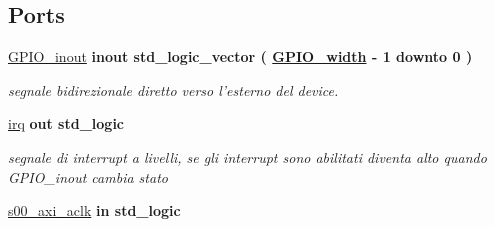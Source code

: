 \subsection*{Ports}
 \begin{DoxyCompactItemize}
\item 
\hypertarget{classmy_g_p_i_o_ga8829699d739ef35a4c5da396ffd38387}{\hyperlink{group__my_g_p_i_o_ga8829699d739ef35a4c5da396ffd38387}{G\+P\+I\+O\+\_\+inout}  {\bfseries {\bfseries \textcolor{vhdlchar}{inout}\textcolor{vhdlchar}{ }}} {\bfseries \textcolor{vhdlchar}{std\+\_\+logic\+\_\+vector}\textcolor{vhdlchar}{ }\textcolor{vhdlchar}{(}\textcolor{vhdlchar}{ }\textcolor{vhdlchar}{ }\textcolor{vhdlchar}{ }\textcolor{vhdlchar}{ }{\bfseries \hyperlink{group__my_g_p_i_o_ga0b52ca75e9a6093b2b60d5e851803069}{G\+P\+I\+O\+\_\+width}} \textcolor{vhdlchar}{-\/}\textcolor{vhdlchar}{ } \textcolor{vhdldigit}{1} \textcolor{vhdlchar}{ }\textcolor{vhdlchar}{downto}\textcolor{vhdlchar}{ }\textcolor{vhdlchar}{ } \textcolor{vhdldigit}{0} \textcolor{vhdlchar}{ }\textcolor{vhdlchar}{)}\textcolor{vhdlchar}{ }} }\label{classmy_g_p_i_o_ga8829699d739ef35a4c5da396ffd38387}

\begin{DoxyCompactList}\small\item\em segnale bidirezionale diretto verso l'esterno del device. \end{DoxyCompactList}\item 
\hypertarget{classmy_g_p_i_o_ga4030f561f17a188ad2b51e1533b79082}{\hyperlink{group__my_g_p_i_o_ga4030f561f17a188ad2b51e1533b79082}{irq}  {\bfseries {\bfseries \textcolor{vhdlchar}{out}\textcolor{vhdlchar}{ }}} {\bfseries \textcolor{vhdlchar}{std\+\_\+logic}\textcolor{vhdlchar}{ }} }\label{classmy_g_p_i_o_ga4030f561f17a188ad2b51e1533b79082}

\begin{DoxyCompactList}\small\item\em segnale di interrupt a livelli, se gli interrupt sono abilitati diventa alto quando G\+P\+I\+O\+\_\+inout cambia stato \end{DoxyCompactList}\item 
\hypertarget{classmy_g_p_i_o_ga037f9e3df8559bfd59db37bcba9cb7a8}{\hyperlink{group__my_g_p_i_o_ga037f9e3df8559bfd59db37bcba9cb7a8}{s00\+\_\+axi\+\_\+aclk}  {\bfseries {\bfseries \textcolor{vhdlchar}{in}\textcolor{vhdlchar}{ }}} {\bfseries \textcolor{vhdlchar}{std\+\_\+logic}\textcolor{vhdlchar}{ }} }\label{classmy_g_p_i_o_ga037f9e3df8559bfd59db37bcba9cb7a8}


\end{DoxyCompactItemize}
